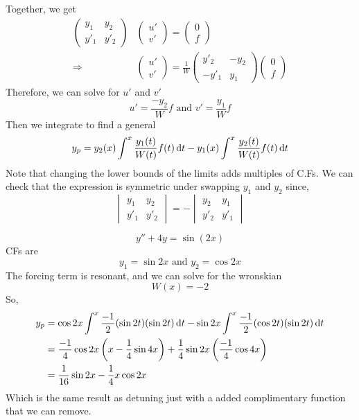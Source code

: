 \documentclass{article}
\begin{document}
Together, we get
\begin{align*}
    \begin{pmatrix}
        y_1 & y_2 \\
        y'_1 & y'_2 
    \end{pmatrix} &\begin{pmatrix}
        u' \\ v'
    \end{pmatrix} 
    = \begin{pmatrix}
        0 \\ f
    \end{pmatrix} \\
    \Rightarrow &\begin{pmatrix}
        u' \\ v'
    \end{pmatrix} = \frac{1}{W} \begin{pmatrix}
        y'_2 & - y_2 \\
        -y'_1 & y_1
    \end{pmatrix} 
    \begin{pmatrix}
        0 \\ f
    \end{pmatrix}
\end{align*}
Therefore, we can solve for $u'$ and $v'$
\[
    u' = \frac{- y_2}{W} f \text{ and } v' = \frac{y_1}{W} f     
\]
Then we integrate to find a general
\[
    y_p = y_2(x) \int^{x}{\frac{y_1(t)}{W(t)} f(t) \mathop{}\!\mathrm{d} t} - y_1(x) \int^{x}{\frac{y_2(t)}{W(t)} f(t) \mathop{}\!\mathrm{d} t}
\]
Note that changing the lower bounds of the limits adds multiples of C.Fs.
We can check that the expression is symmetric under swapping $y_1$ and $y_2$ since,
\[
    \begin{vmatrix}
        y_1 & y_2 \\
        y'_1 & y'_2 
    \end{vmatrix}
    = - \begin{vmatrix}
        y_2 & y_1 \\
        y'_2 & y'_1 
    \end{vmatrix}
\]

\begin{eg}
    \[
        y'' + 4y = \sin (2x)  
    \]
    CFs are
    \[
        y_1 = \sin 2x \text{ and } y_2 = \cos 2x    
    \]
    The forcing term is resonant, and we can solve for the wronskian
    \[
        W(x) = -2   
    \]
    So, 
    \begin{align*}
        y_p &= \cos 2x \int^{x}{\frac{-1}{2} (\sin 2t) (\sin 2t) \mathop{}\!\mathrm{d} t} - \sin 2x \int^{x}{\frac{-1}{2} (\cos 2t) (\sin 2t) \mathop{}\!\mathrm{d} t} \\
        &= \frac{-1}{4} \cos 2x \left( x - \frac{1}{4} \sin 4x \right) + \frac{1}{4} \sin 2x \left( \frac{-1}{4}\cos 4x \right) \\
        &= \frac{1}{16} \sin 2x - \frac{1}{4} x \cos 2x
    \end{align*}
    Which is the same result as detuning just with a added complimentary function that we can remove.
\end{eg}
\end{document}
